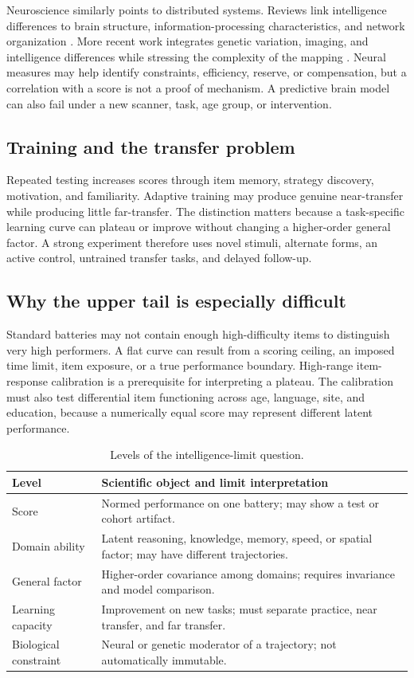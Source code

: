 \documentclass[conference]{IEEEtran}
\begin{document}
Neuroscience similarly points to distributed systems. Reviews link intelligence differences to brain structure, information-processing characteristics, and network organization \cite{deary2010}. More recent work integrates genetic variation, imaging, and intelligence differences while stressing the complexity of the mapping \cite{deary2021}. Neural measures may help identify constraints, efficiency, reserve, or compensation, but a correlation with a score is not a proof of mechanism. A predictive brain model can also fail under a new scanner, task, age group, or intervention.

\subsection{Training and the transfer problem}
Repeated testing increases scores through item memory, strategy discovery, motivation, and familiarity. Adaptive training may produce genuine near-transfer while producing little far-transfer. The distinction matters because a task-specific learning curve can plateau or improve without changing a higher-order general factor. A strong experiment therefore uses novel stimuli, alternate forms, an active control, untrained transfer tasks, and delayed follow-up.

\subsection{Why the upper tail is especially difficult}
Standard batteries may not contain enough high-difficulty items to distinguish very high performers. A flat curve can result from a scoring ceiling, an imposed time limit, item exposure, or a true performance boundary. High-range item-response calibration is a prerequisite for interpreting a plateau. The calibration must also test differential item functioning across age, language, site, and education, because a numerically equal score may represent different latent performance.

\begin{table}[t]
\caption{Levels of the intelligence-limit question.}
\label{tab:levels}
\centering
\footnotesize
\setlength{\tabcolsep}{2pt}
\begin{tabular}{p{}p{}}
\toprule
Level & Scientific object and limit interpretation\\
\midrule
Score & Normed performance on one battery; may show a test or cohort artifact.\\
Domain ability & Latent reasoning, knowledge, memory, speed, or spatial factor; may have different trajectories.\\
General factor & Higher-order covariance among domains; requires invariance and model comparison.\\
Learning capacity & Improvement on new tasks; must separate practice, near transfer, and far transfer.\\
Biological constraint & Neural or genetic moderator of a trajectory; not automatically immutable.\\
\bottomrule
\end{tabular}
\end{table}
\end{document}
